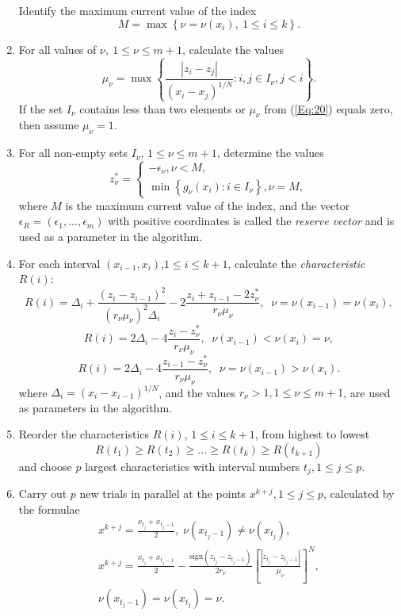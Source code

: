\documentclass[runningheads]{llncs}
\begin{document}
\begin{enumerate}
Identify the maximum current value of the index
\begin{equation}\label{Eq:19}
M=\max \left\{\nu = \nu(x_i), \ 1\leq i \leq k\right\}.
\end{equation}
\item
For all values of $\nu, \ 1\leq \nu \leq m+1$, calculate the values
\begin{equation}\label{Eq:20}
\mu_\nu = \max \left\{ \frac{\left|z_i-z_j\right|}{\left(x_i-x_j\right)^{1/N}} : i,j \in I_\nu,
j<i\right\}.
\end{equation}
If the set $I_\nu$ contains less than two elements or $\mu_\nu$ from (\ref{Eq:20}) equals zero,
then assume $\mu_\nu=1$.
\item
For all non-empty sets $I_\nu$, $1 \leq \nu \leq m+1$, determine the values
\begin{equation}\label{Eq:21}
  z^\ast_\nu =
   \begin{cases}
    -\epsilon_\nu,  \nu < M, \\
    \min{\left\{g_\nu(x_i):i\in I_\nu\right\}}, \nu = M,
   \end{cases}
\end{equation}
where $M$ is the maximum current value of the index, and the vector $\epsilon _R=\left(\epsilon_1,...,\epsilon_m\right)$ with positive coordinates is called the \textit{reserve vector} and is used as a parameter in the
algorithm.
\item
For each interval $(x_{i-1},x_i)$,$1 \leq i \leq k+1$, calculate the \textit{characteristic} $R(i)$:
\[
R(i)=\Delta_i+ \frac{(z_i-z_{i-1})^2}{(r_\nu\mu_\nu)^2\Delta_i}-2\frac{z_i+z_{i-1}-
2z^\ast_\nu}{r_\nu\mu_\nu},\;\; \nu=\nu(x_{i-1})=\nu(x_i),
\]
\[
R(i)= 2\Delta_i-4\frac{z_i-z^\ast_\nu}{r_\nu\mu_\nu},\;\; \nu(x_{i-1})<\nu(x_i)=\nu,
\]
\[
R(i)= 2\Delta_i-4\frac{z_{i-1}-z^\ast_\nu}{r_\nu\mu_\nu},\;\; \nu = \nu(x_{i-1})>\nu(x_i).
\]
where $\Delta_i=(x_i-x_{i-1})^{1/N}$, and the values $r_\nu>1, 1\leq\nu\leq m+1$, are used as
parameters in the algorithm.
\item
Reorder the characteristics $R(i)$, $1\leq i \leq k+1$, from highest to lowest
\begin{equation}\label{Eq:23}
R(t_1)\geq R(t_2)\geq ... \geq R(t_{k})\geq R(t_{k+1})
\end{equation}
and choose $p$ largest characteristics with interval numbers $t_j, 1\leq j \leq p$.
\item
Carry out $p$ new trials in parallel at the points $x^{k+j}, 1 \leq j \leq p$, calculated by the
formulae
\begin{gather*}
x^{k+j}=\frac{x_{t_j}+x_{t_j-1}}{2}, \; \nu(x_{t_j-1})\neq \nu(x_{t_j}),\\
x^{k+j}=\frac{x_{t_j}+x_{t_j-1}}{2}- \frac{\mathrm{sign}(z_{t_j}-z_{t_j-
1})}{2r_\nu}\left[\frac{\left|z_{t_j}-z_{t_j-1}\right|}{\mu_\nu}\right]^N, \\
\nu(x_{t_j-1})=\nu(x_{t_j})=\nu.
\end{gather*}

\end{enumerate}
\end{document}
